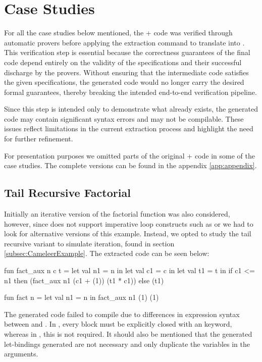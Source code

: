 \section{Case Studies}
\label{sec:Case_Studies}

For all the case studies below mentioned, the \ocaml + \gospel code was verified through \whythree automatic
provers before applying the extraction command to translate into \cml. This verification step is essential because the correctness 
guarantees of the final \cml code depend entirely on the validity of the specifications and their successful discharge by the 
provers. Without ensuring that the \whyml intermediate code satisfies the given specifications, the generated \cml code would 
no longer carry the desired formal guarantees, thereby breaking the intended end-to-end verification pipeline.

Since this step is intended only to demonstrate what already exists, the generated code may contain significant syntax errors 
and may not be compilable. These issues reflect limitations in the current extraction process and highlight the need for 
further refinement.

For presentation purposes we omitted parts of the original \ocaml + \gospel code in some of the case studies. The complete 
versions can be found in the appendix \ref{app:appendix}.

\subsection{Tail Recursive Factorial}

Initially an iterative version of the factorial function was also considered, however, since \cml does not support imperative loop 
constructs such as  or  we had to look for alternative versions of this example. Instead, we opted 
to study the tail recursive variant to simulate iteration, found in section \ref{subsec:CameleerExample}. The extracted code can be seen below:

\begin{cakeml}
fun fact_aux n c t = let val n1 = n in
  let val c1 = c in
  let val t1 = t in
  if c1 <= n1 then (fact_aux n1 (c1 + (1)) (t1 * c1))  else (t1)

fun fact n = let val n1 = n in fact_aux n1 (1) (1)
\end{cakeml}

The generated \cml code failed to compile due to differences in  expression syntax between \ocaml and \cml. In \cml, every 
 block must be explicitly closed with an  keyword, whereas in \ocaml, this is not required. It should
also be mentioned that the generated let-bindings generated are not necessary and only duplicate the variables in the arguments.

